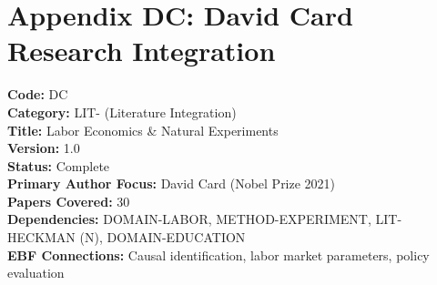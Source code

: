 
\chapter*{Appendix DC: David Card Research Integration}
\label{app:card}

\begin{tcolorbox}[colback=blue!5!white, colframe=blue!75!black, title=Appendix Metadata]
\textbf{Code:} DC \\
\textbf{Category:} LIT- (Literature Integration) \\
\textbf{Title:} Labor Economics \& Natural Experiments \\
\textbf{Version:} 1.0 \\
\textbf{Status:} Complete \\
\textbf{Primary Author Focus:} David Card (Nobel Prize 2021) \\
\textbf{Papers Covered:} 30 \\
\textbf{Dependencies:} DOMAIN-LABOR, METHOD-EXPERIMENT, LIT-HECKMAN (N), DOMAIN-EDUCATION \\
\textbf{EBF Connections:} Causal identification, labor market parameters, policy evaluation
\end{tcolorbox}

